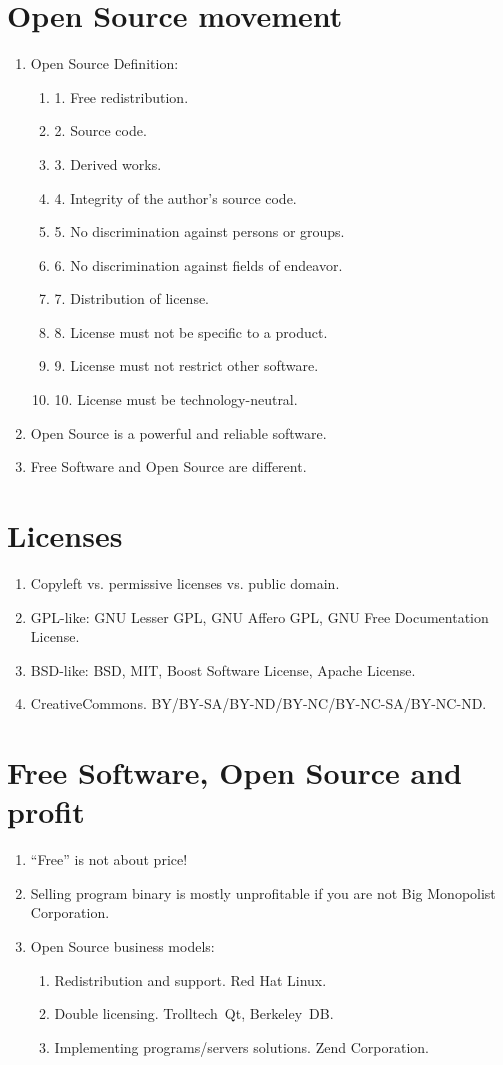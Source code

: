 \documentclass[10pt,a4paper]{article}
\newcommand{\bee}{\begin{enumerate}}
\newcommand{\ene}{\end{enumerate}}
\begin{document}
\section{Open Source movement}
\bee
  \item Open Source Definition:
  \bee
    \item[1.] Free redistribution.
    \item[2.] Source code.
    \item[3.] Derived works.
    \item[4.] Integrity of the author's source code.
    \item[5.] No discrimination against persons or groups.
    \item[6.] No discrimination against fields of endeavor.
    \item[7.] Distribution of license.
    \item[8.] License must not be specific to a product.
    \item[9.] License must not restrict other software.
    \item[10.] License must be technology-neutral.
  \ene
  \item Open Source is a powerful and reliable software.
  \item Free Software and Open Source are different.
\ene

\section{Licenses}
\bee
  \item Copyleft vs. permissive licenses vs. public domain.
  \item GPL-like: GNU Lesser GPL, GNU Affero GPL, GNU Free Documentation License.
  \item BSD-like: BSD, MIT, Boost Software License, Apache License.
  \item CreativeCommons. BY/BY-SA/BY-ND/BY-NC/BY-NC-SA/BY-NC-ND.
\ene

\section{Free Software, Open Source and profit}
\bee
  \item ``Free'' is not about price!
  \item Selling program binary is mostly unprofitable if you are not Big Monopolist Corporation.
  \item Open Source business models:
  \bee
    \item Redistribution and support. Red Hat Linux.
    \item Double licensing. Trolltech~Qt, Berkeley~DB.
    \item Implementing programs/servers solutions. Zend Corporation.
  \ene
\ene
\end{document}
